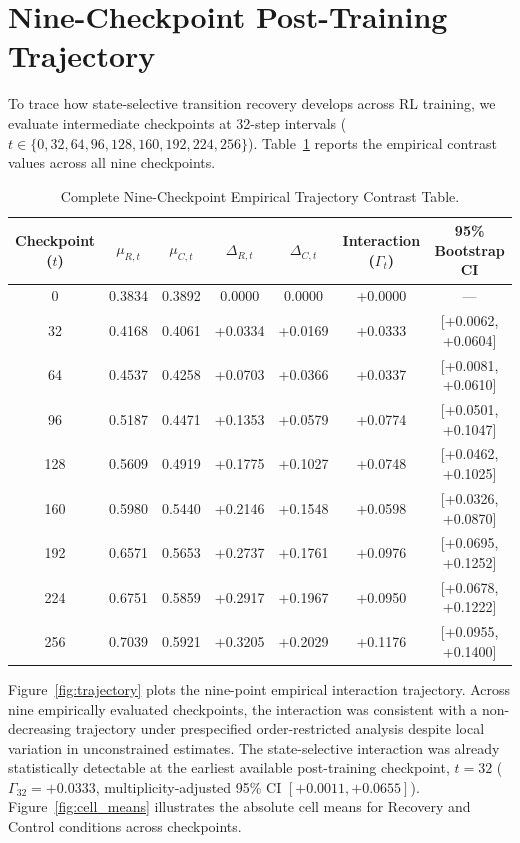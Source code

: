\documentclass[11pt,3p,review]{elsarticle}
\begin{document}
\section{Nine-Checkpoint Post-Training Trajectory}
To trace how state-selective transition recovery develops across RL training, we evaluate intermediate checkpoints at 32-step intervals ($t \in \{0, 32, 64, 96, 128, 160, 192, 224, 256\}$). Table~\ref{tab:trajectory} reports the empirical contrast values across all nine checkpoints.

\begin{table}[htbp]
\centering
\caption{Complete Nine-Checkpoint Empirical Trajectory Contrast Table.}
\label{tab:trajectory}
\begin{tabular}{ccccccc}
\toprule
Checkpoint ($t$) & $\mu_{R,t}$ & $\mu_{C,t}$ & $\Delta_{R,t}$ & $\Delta_{C,t}$ & Interaction ($\Gamma_t$) & 95\% Bootstrap CI \\
\midrule
0   & 0.3834 & 0.3892 & 0.0000 & 0.0000 & +0.0000 & --- \\
32  & 0.4168 & 0.4061 & +0.0334 & +0.0169 & +0.0333 & [+0.0062, +0.0604] \\
64  & 0.4537 & 0.4258 & +0.0703 & +0.0366 & +0.0337 & [+0.0081, +0.0610] \\
96  & 0.5187 & 0.4471 & +0.1353 & +0.0579 & +0.0774 & [+0.0501, +0.1047] \\
128 & 0.5609 & 0.4919 & +0.1775 & +0.1027 & +0.0748 & [+0.0462, +0.1025] \\
160 & 0.5980 & 0.5440 & +0.2146 & +0.1548 & +0.0598 & [+0.0326, +0.0870] \\
192 & 0.6571 & 0.5653 & +0.2737 & +0.1761 & +0.0976 & [+0.0695, +0.1252] \\
224 & 0.6751 & 0.5859 & +0.2917 & +0.1967 & +0.0950 & [+0.0678, +0.1222] \\
256 & 0.7039 & 0.5921 & +0.3205 & +0.2029 & +0.1176 & [+0.0955, +0.1400] \\
\bottomrule
\end{tabular}
\end{table}

Figure~\ref{fig:trajectory} plots the nine-point empirical interaction trajectory. Across nine empirically evaluated checkpoints, the interaction was consistent with a non-decreasing trajectory under prespecified order-restricted analysis despite local variation in unconstrained estimates. The state-selective interaction was already statistically detectable at the earliest available post-training checkpoint, $t=32$ ($\Gamma_{32} = +0.0333$, multiplicity-adjusted 95\% CI $[+0.0011, +0.0655]$). Figure~\ref{fig:cell_means} illustrates the absolute cell means for Recovery and Control conditions across checkpoints.
\end{document}
